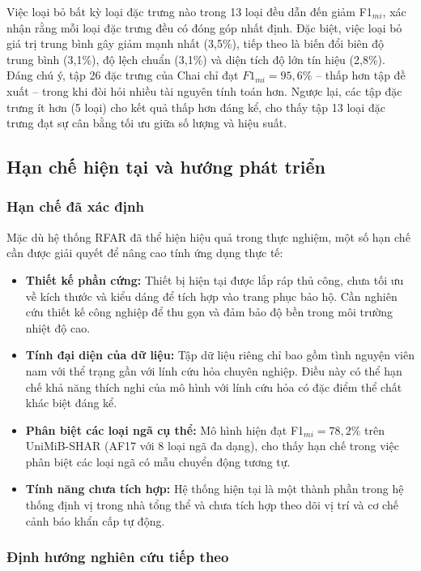 Việc loại bỏ bất kỳ loại đặc trưng nào trong 13 loại đều dẫn đến giảm F1$_{mi}$, xác nhận rằng mỗi loại đặc trưng đều có đóng góp nhất định. Đặc biệt, việc loại bỏ giá trị trung bình gây giảm mạnh nhất (3,5\%), tiếp theo là biến đổi biên độ trung bình (3,1\%), độ lệch chuẩn (3,1\%) và diện tích độ lớn tín hiệu (2,8\%). Đáng chú ý, tập 26 đặc trưng của Chai \cite{CHAI_FIRE2024} chỉ đạt $F1_{mi} = 95{,}6\%$ -- thấp hơn tập đề xuất -- trong khi đòi hỏi nhiều tài nguyên tính toán hơn. Ngược lại, các tập đặc trưng ít hơn (5 loại) cho kết quả thấp hơn đáng kể, cho thấy tập 13 loại đặc trưng đạt sự cân bằng tối ưu giữa số lượng và hiệu suất.

\subsection{Hạn chế hiện tại và hướng phát triển}

\subsubsection{Hạn chế đã xác định}

Mặc dù hệ thống RFAR đã thể hiện hiệu quả trong thực nghiệm, một số hạn chế cần được giải quyết để nâng cao tính ứng dụng thực tế:

\begin{itemize}
    \item \textbf{Thiết kế phần cứng:} Thiết bị hiện tại được lắp ráp thủ công, chưa tối ưu về kích thước và kiểu dáng để tích hợp vào trang phục bảo hộ. Cần nghiên cứu thiết kế công nghiệp để thu gọn và đảm bảo độ bền trong môi trường nhiệt độ cao.
    \item \textbf{Tính đại diện của dữ liệu:} Tập dữ liệu riêng chỉ bao gồm tình nguyện viên nam với thể trạng gần với lính cứu hỏa chuyên nghiệp. Điều này có thể hạn chế khả năng thích nghi của mô hình với lính cứu hỏa có đặc điểm thể chất khác biệt đáng kể.
    \item \textbf{Phân biệt các loại ngã cụ thể:} Mô hình hiện đạt F1$_{mi} = 78{,}2\%$ trên UniMiB-SHAR (AF17 với 8 loại ngã đa dạng), cho thấy hạn chế trong việc phân biệt các loại ngã có mẫu chuyển động tương tự.
    \item \textbf{Tính năng chưa tích hợp:} Hệ thống hiện tại là một thành phần trong hệ thống định vị trong nhà tổng thể và chưa tích hợp theo dõi vị trí và cơ chế cảnh báo khẩn cấp tự động.
\end{itemize}

\subsubsection{Định hướng nghiên cứu tiếp theo}

